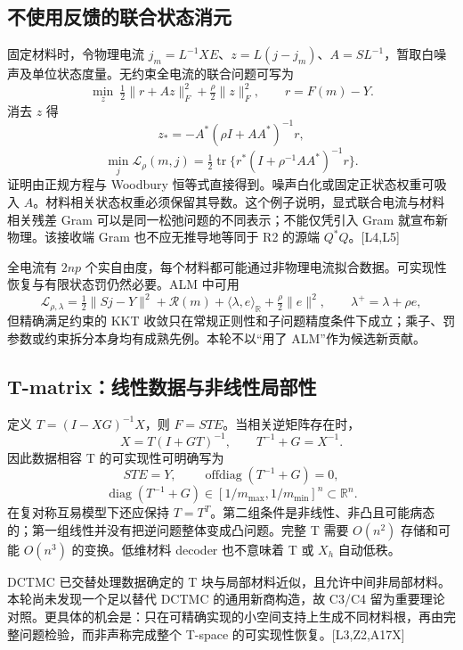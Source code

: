 \documentclass[10pt,a4paper]{article}
\begin{document}
\hypertarget{ux4e0dux4f7fux7528ux53cdux9988ux7684ux8054ux5408ux72b6ux6001ux6d88ux5143}{%
\subsection{不使用反馈的联合状态消元}\label{ux4e0dux4f7fux7528ux53cdux9988ux7684ux8054ux5408ux72b6ux6001ux6d88ux5143}}

固定材料时，令物理电流
\(j_m=L^{-1}XE\)、\(z=L(j-j_m)\)、\(A=SL^{-1}\)，暂取白噪声及单位状态度量。无约束全电流的联合问题可写为
\[\min_z\ \tfrac12\|r+Az\|_F^2+\tfrac\rho2\|z\|_F^2,
\qquad r=F(m)-Y.\] 消去 \(z\) 得 \[z_*=-A^*(\rho I+AA^*)^{-1}r,\]
\[\boxed{\min_j\mathcal L_\rho(m,j)
=\tfrac12\operatorname{tr}\{r^*(I+\rho^{-1}AA^*)^{-1}r\}.}\]
证明由正规方程与 Woodbury 恒等式直接得到。噪声白化或固定正状态权重可吸入
\(A\)。材料相关状态权重必须保留其导数。这个例子说明，显式联合电流与材料相关残差
Gram 可以是同一松弛问题的不同表示；不能仅凭引入 Gram
就宣布新物理。该接收端 Gram 也不应无推导地等同于 R2 的源端
\(Q^*Q\)。{[}L4,L5{]}

全电流有 \(2np\)
个实自由度，每个材料都可能通过非物理电流拟合数据。可实现性恢复与有限状态罚仍然必要。ALM
中可用 \[\mathcal L_{\rho,\lambda}=\tfrac12\|Sj-Y\|^2+\mathcal R(m)
+\langle\lambda,e\rangle_{\mathbb R}+\tfrac\rho2\|e\|^2,
\qquad\lambda^+=\lambda+\rho e,\] 但精确满足约束的 KKT
收敛只在常规正则性和子问题精度条件下成立；乘子、罚参数或约束拆分本身均有成熟先例。本轮不以``用了
ALM''作为候选新贡献。

\hypertarget{t-matrixux7ebfux6027ux6570ux636eux4e0eux975eux7ebfux6027ux5c40ux90e8ux6027}{%
\subsection{T-matrix：线性数据与非线性局部性}\label{t-matrixux7ebfux6027ux6570ux636eux4e0eux975eux7ebfux6027ux5c40ux90e8ux6027}}

定义 \(T=(I-XG)^{-1}X\)，则 \(F=STE\)。当相关逆矩阵存在时，
\[X=T(I+GT)^{-1},\qquad T^{-1}+G=X^{-1}.\] 因此数据相容 T
的可实现性可明确写为 \[STE=Y,\qquad\operatorname{offdiag}(T^{-1}+G)=0,\]
\[\operatorname{diag}(T^{-1}+G)\in[1/m_{\max},1/m_{\min}]^n\subset\mathbb R^n.\]
在复对称互易模型下还应保持
\(T=T^T\)。第二组条件是非线性、非凸且可能病态的；第一组线性并没有把逆问题整体变成凸问题。完整
T 需要 \(O(n^2)\) 存储和可能 \(O(n^3)\) 的变换。低维材料 decoder
也不意味着 T 或 \(X_h\) 自动低秩。

DCTMC 已交替处理数据确定的 T
块与局部材料近似，且允许中间非局部材料。本轮尚未发现一个足以替代 DCTMC
的通用新商构造，故 C3/C4
留为重要理论对照。更具体的机会是：只在可精确实现的小空间支持上生成不同材料根，再由完整问题检验，而非声称完成整个
T-space 的可实现性恢复。{[}L3,Z2,A17X{]}
\end{document}
